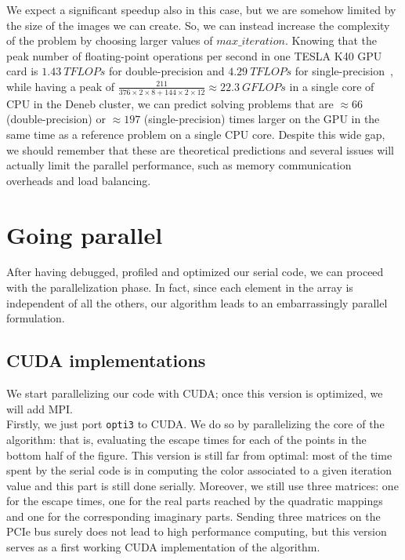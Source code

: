 \documentclass[11pt,a4paper]{article}
\begin{document}
We expect a significant speedup also in this case, but we are somehow limited by the size of the images we can create.
So, we can instead increase the complexity of the problem by choosing larger values of $max\_iteration$.
Knowing that the peak number of floating-point operations per second in one TESLA K40 GPU card is $1.43~TFLOPs$ for double-precision and $4.29~TFLOPs$ for single-precision~\cite{gpus}, while having a peak of $\frac{211}{376\times2\times8 + 144\times2\times12}\approx22.3~GFLOPs$ in a single core of CPU in the Deneb cluster, we can predict solving problems that are $\approx66$ (double-precision) or $\approx197$ (single-precision) times larger on the GPU in the same time as a reference problem on a single CPU core.
Despite this wide gap, we should remember that these are theoretical predictions and several issues will actually limit the parallel performance, such as memory communication overheads and load balancing.

\vspace{-0.2cm}
\section{Going parallel}

After having debugged, profiled and optimized our serial code, we can proceed with the parallelization phase.
In fact, since each element in the array is independent of all the others, our algorithm leads to an embarrassingly parallel formulation.

\vspace{-0.2cm}
\subsection{CUDA implementations}

We start parallelizing our code with CUDA; once this version is optimized, we will add MPI.\\[-7pt]

Firstly, we just port \texttt{opti3} to CUDA. 
We do so by parallelizing the core of the algorithm: that is, evaluating the escape times for each of the points in the bottom half of the figure.
This version is still far from optimal: most of the time spent by the serial code is in computing the color associated to a given iteration value and this part is still done serially.
Moreover, we still use three matrices: one for the escape times, one for the real parts reached by the quadratic mappings and one for the corresponding imaginary parts.
Sending three matrices on the PCIe bus surely does not lead to high performance computing, but this version serves as a first working CUDA implementation of the algorithm.\\[-7pt]
\end{document}
